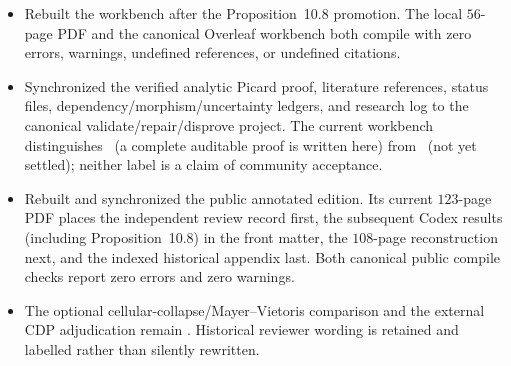 \begin{itemize}[leftmargin=1.8em]
\item Rebuilt the workbench after the Proposition~10.8 promotion.  The local
  \(56\)-page PDF and the canonical Overleaf workbench both compile with
  zero errors, warnings, undefined references, or undefined citations.
\item Synchronized the verified analytic Picard proof, literature references,
  status files, dependency/morphism/uncertainty ledgers, and research log to
  the canonical validate/repair/disprove project.  The current workbench
  distinguishes \Verified\ (a complete auditable proof is written here) from
  \Open\ (not yet settled); neither label is a claim of community acceptance.
\item Rebuilt and synchronized the public annotated edition.  Its current
  \(123\)-page PDF places the independent review record first, the subsequent
  Codex results (including Proposition~10.8) in the front matter, the
  \(108\)-page reconstruction next, and the indexed historical appendix last.
  Both canonical public compile checks report zero errors and zero warnings.
\item The optional cellular-collapse/Mayer--Vietoris comparison and the
  external CDP adjudication remain \Open.  Historical reviewer wording is
  retained and labelled rather than silently rewritten.
\end{itemize}
